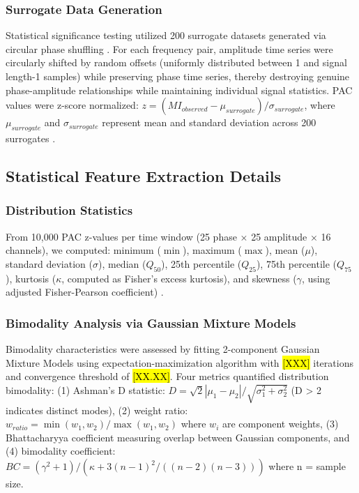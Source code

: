 \subsubsection{Surrogate Data Generation}
Statistical significance testing utilized 200 surrogate datasets generated via circular phase shuffling \cite{Aru2014UntanglingCCD}. For each frequency pair, amplitude time series were circularly shifted by random offsets (uniformly distributed between 1 and signal length-1 samples) while preserving phase time series, thereby destroying genuine phase-amplitude relationships while maintaining individual signal statistics. PAC values were z-score normalized: $z = (MI_{observed} - \mu_{surrogate})/\sigma_{surrogate}$, where $\mu_{surrogate}$ and $\sigma_{surrogate}$ represent mean and standard deviation across 200 surrogates \cite{Jensen2016DiscriminatingVFR}.

\subsection{Statistical Feature Extraction Details}
\subsubsection{Distribution Statistics}
From 10,000 PAC z-values per time window (25 phase × 25 amplitude × 16 channels), we computed: minimum ($\min$), maximum ($\max$), mean ($\mu$), standard deviation ($\sigma$), median ($Q_{50}$), 25th percentile ($Q_{25}$), 75th percentile ($Q_{75}$), kurtosis ($\kappa$, computed as Fisher's excess kurtosis), and skewness ($\gamma$, using adjusted Fisher-Pearson coefficient) \cite{Hlsemann2019QuantificationOPA,Scherer2022DirectMIM}.

\subsubsection{Bimodality Analysis via Gaussian Mixture Models}
Bimodality characteristics were assessed by fitting 2-component Gaussian Mixture Models using expectation-maximization algorithm with \hl{[XXX]} iterations and convergence threshold of \hl{[XX.XX]}. Four metrics quantified distribution bimodality: (1) Ashman's D statistic: $D = \sqrt{2}|\mu_1 - \mu_2|/\sqrt{\sigma_1^2 + \sigma_2^2}$ (D > 2 indicates distinct modes), (2) weight ratio: $w_{ratio} = \min(w_1, w_2)/\max(w_1, w_2)$ where $w_i$ are component weights, (3) Bhattacharyya coefficient measuring overlap between Gaussian components, and (4) bimodality coefficient: $BC = (\gamma^2 + 1)/({\kappa + 3(n-1)^2/((n-2)(n-3))})$ where n = sample size.

